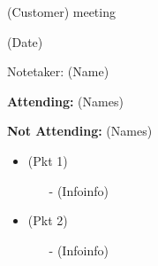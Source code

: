 \documentclass[11pt]{article}
\begin{document}
\thispagestyle{empty}

{\huge (Customer) meeting\\}

{\large (Date)}

{\large Notetaker: (Name)\\}

{\bf Attending:} (Names)

{\bf Not Attending:} (Names)




\begin{itemize}
	\item (Pkt 1)
	\begin{itemize}
		\item[-] (Infoinfo)
	\end{itemize}
	\item (Pkt 2) 
	\begin{itemize}
		\item[-] (Infoinfo)
	\end{itemize}
\end{itemize}
\end{document}
